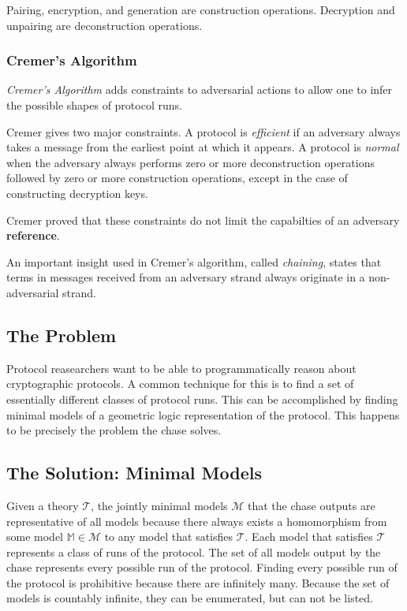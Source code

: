			Pairing, encryption, and generation are construction operations.
			Decryption and unpairing are deconstruction operations.

		\subsubsection{Cremer's Algorithm}

			\emph{Cremer's Algorithm} adds constraints to adversarial actions
			to allow one to infer the possible shapes of protocol runs.

			Cremer gives two major constraints. A protocol is \emph{efficient}
			if an adversary always takes a message from the earliest point at
			which it appears. A protocol is \emph{normal} when the adversary
			always performs zero or more deconstruction operations followed by
			zero or more construction operations, except in the case of
			constructing decryption keys.

			Cremer proved that these constraints do not limit the capabilties
			of an adversary \textbf{reference}.

			An important insight used in Cremer's algorithm, called
			\emph{chaining}, states that terms in messages received from an
			adversary strand always originate in a non-adversarial strand.

	\subsection{The Problem}

		Protocol reasearchers want to be able to programmatically reason about
		cryptographic protocols. A common technique for this is to find a set of
		essentially different classes of protocol runs. This can be accomplished by
		finding minimal models of a geometric logic representation of the protocol.
		This happens to be precisely the problem the chase solves.

	\subsection{The Solution: Minimal Models}

		Given a theory $\mathcal{T}$, the jointly minimal models $\mathcal{M}$
		that the chase outputs are representative of all models because there
		always exists a homomorphism from some model $\mathbb{M} \in
		\mathcal{M}$ to any model that satisfies $\mathcal{T}$. Each model that
		satisfies $\mathcal{T}$ represents a class of runs of the protocol. The
		set of all models output by the chase represents every possible run of
		the protocol. Finding every possible run of the protocol is prohibitive
		because there are infinitely many. Because the set of models is
		countably infinite, they can be enumerated, but can not be listed.

